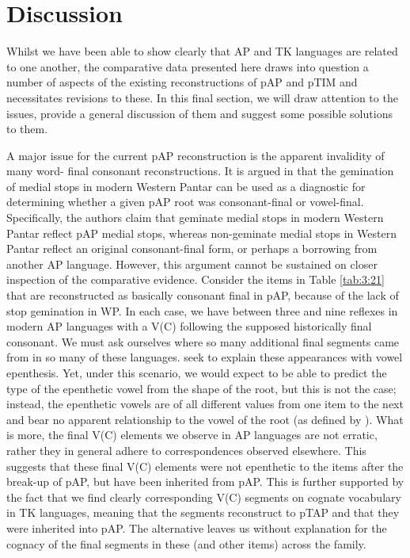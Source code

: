 \section{Discussion}
Whilst we have been able to show clearly that AP and TK languages are related to one another, the comparative data presented here draws into question a number of aspects of the existing reconstructions of pAP and pTIM and necessitates revisions to these. In this final section, we will draw attention to the issues, provide a general discussion of them and suggest some possible solutions to them. 

A major issue for the current pAP reconstruction is the apparent invalidity of many word- final consonant reconstructions. It is argued in \citet[95]{HoltonEtAl2012} that the gemination of medial stops in modern Western Pantar can be used as a diagnostic for determining whether a given pAP root was consonant-final or vowel-final. Specifically, the authors claim that geminate medial stops in modern Western Pantar reflect pAP medial stops, whereas non-geminate medial stops in Western Pantar reflect an original consonant-final form, or perhaps a borrowing from another AP language. However, this argument cannot be sustained on closer inspection of the comparative evidence. Consider the items in Table \ref{tab:3:21} that are reconstructed as basically consonant final in pAP, because of the lack of stop gemination in WP. In each case, we have between three and nine reflexes in modern AP languages with a V(C) following the supposed historically final consonant. We must ask ourselves where so many additional final segments came from in so many of these languages. \citet{HoltonEtAl2012} seek to explain these appearances with vowel epenthesis. Yet, under this scenario, we would expect to be able to predict the type of the epenthetic vowel from the shape of the root, but this is not the case; instead, the epenthetic vowels are of all different values from one item to the next and bear no apparent relationship to the vowel of the root (as defined by \citealt{HoltonEtAl2012}). What is more, the final V(C) elements we observe in AP languages are not erratic, rather they in general adhere to correspondences observed elsewhere. This suggests that these final V(C) elements were not epenthetic to the items after the break-up of pAP, but have been inherited from pAP. This is further supported by the fact that we find clearly corresponding V(C) segments on cognate vocabulary in TK languages, meaning that the segments reconstruct to pTAP and that they were inherited into pAP. The alternative leaves us without explanation for the cognacy of the final segments in these (and other items) across the family. 
 

